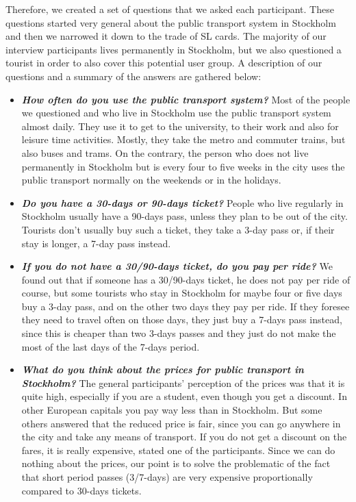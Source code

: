 \documentclass[11pt,twoside,a4paper]{report}
\begin{document}
Therefore, we created a set of questions that we asked each participant. These questions started very general about the public transport system in Stockholm and then we narrowed it down to the trade of SL cards. The majority of our interview participants lives permanently in Stockholm, but we also questioned a tourist in order to also cover this potential user group. A description of our questions and a summary of the answers are gathered below:

\begin{itemize}
	\item \textbf{\textit{How often do you use the public transport system?}} Most of the people we questioned and who live in Stockholm use the public transport system almost daily. They use it to get to the university, to their work and also for leisure time activities. Mostly, they take the metro and commuter trains, but also buses and trams. On the contrary, the person who does not live permanently in Stockholm but is every four to five weeks in the city uses the public transport normally on the weekends or in the holidays.
	\item \textbf{\textit{Do you have a 30-days or 90-days ticket?}} People who live regularly in Stockholm usually have a 90-days pass, unless they plan to be out of the city. Tourists don't usually buy such a ticket, they take a 3-day pass or, if their stay is longer, a 7-day pass instead.
	\item \textbf{\textit{If you do not have a 30/90-days ticket, do you pay per ride?}} We found out that if someone has a 30/90-days ticket, he does not pay per ride of course, but some tourists who stay in Stockholm for maybe four or five days buy a 3-day pass, and on the other two days they pay per ride. If they foresee they need to travel often on those days, they just buy a 7-days pass instead, since this is cheaper than two 3-days passes and they just do not make the most of the last days of the 7-days period.
	\item \textbf{\textit{What do you think about the prices for public transport in Stockholm?}} The general participants' perception of the prices was that it is quite high, especially if you are a student, even though you get a discount. In other European capitals you pay way less than in Stockholm. But some others answered that the reduced price is fair, since you can go anywhere in the city and take any means of transport. If you do not get a discount on the fares, it is really expensive, stated one of the participants. Since we can do nothing about the prices, our point is to solve the problematic of the fact that short period passes (3/7-days) are very expensive proportionally compared to 30-days tickets.

\end{itemize}
\end{document}

